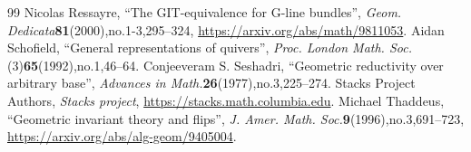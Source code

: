 \documentclass[10pt,a4paper]{amsart}
\theoremstyle{definition}
\begin{document}
\begin{thebibliography}{99}
 Nicolas Ressayre, ``The GIT-equivalence for G-line bundles'', \emph{Geom. Dedicata}\textbf{81}(2000),no.1-3,295--324, \url{https://arxiv.org/abs/math/9811053}.
 Aidan Schofield, ``General representations of quivers'', \emph{Proc. London Math. Soc.}(3)\textbf{65}(1992),no.1,46--64.
 Conjeeveram S. Seshadri, ``Geometric reductivity over arbitrary base'', \emph{Advances in Math.}\textbf{26}(1977),no.3,225--274.
 Stacks Project Authors, \emph{Stacks project}, \url{https://stacks.math.columbia.edu}.
 Michael Thaddeus, ``Geometric invariant theory and flips'', \emph{J. Amer. Math. Soc.}\textbf{9}(1996),no.3,691--723, \url{https://arxiv.org/abs/alg-geom/9405004}.
\end{thebibliography}
\end{document}
